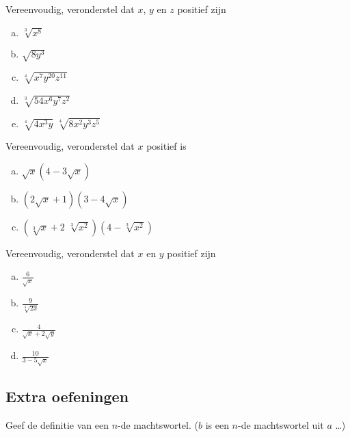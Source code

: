 \documentclass[12pt,twoside]{article}
\begin{document}
\begin{oefening}
  Vereenvoudig, veronderstel dat $x$, $y$ en $z$ positief zijn
  \begin{enumerate}[(a)]
    \itemsep1em
  \item \(\sqrt[3]{{{x^8}}}\)
  \item \(\sqrt {8{y^3}} \)
  \item \(\sqrt[4]{{{x^7}{y^{20}}{z^{11}}}}\)
  \item \(\sqrt[3]{{54{x^6}{y^7}{z^2}}}\)
  \item \(\sqrt[4]{{4{x^3}y}}\,\,\sqrt[4]{{8{x^2}{y^3}{z^5}}}\)
  \end{enumerate}
\end{oefening}

\begin{oefening}
  Vereenvoudig, veronderstel dat $x$ positief is
  \begin{enumerate}[(a)]
    \itemsep1em
  \item \(\sqrt x \left( {4 - 3\sqrt x } \right)\)
  \item \(\left( {2\sqrt x + 1} \right)\left( {3 - 4\sqrt x } \right)\)
\item \(\left( {\sqrt[3]{x} + 2\,\,\sqrt[3]{{{x^2}}}} \right)\left( {4 - \sqrt[3]{{{x^2}}}} \right)\)
  \end{enumerate}
\end{oefening}

\begin{oefening}
  Vereenvoudig, veronderstel dat $x$ en $y$ positief zijn
  \begin{enumerate}[(a)]
    \itemsep1em
  \item \(\displaystyle \frac{6}{{\sqrt x }}\)
  \item \(\displaystyle \frac{9}{{\sqrt[3]{{2x}}}}\)
  \item \(\displaystyle \frac{4}{{\sqrt x + 2\sqrt y }}\)
  \item \(\displaystyle \frac{{10}}{{3 - 5\sqrt x }}\)
  \end{enumerate}
\end{oefening}

\subsection{Extra oefeningen}

\begin{oefening}
Geef de definitie van een $n$-de machtswortel. ($b$ is een $n$-de machtswortel uit $a$ \ldots)
\end{oefening}
\end{document}
